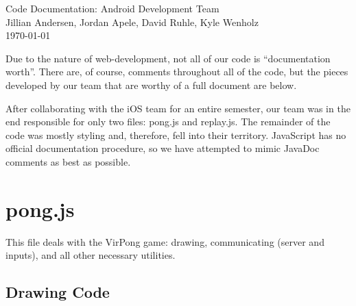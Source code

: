 \documentclass[12pt]{article}
\begin{document}
 \begin{titlepage}
    \vspace*{\fill}
    \begin{center}
      {\Huge Code Documentation: Android Development Team}\\[0.5cm]
      {\Large Jillian Andersen, Jordan Apele, David Ruhle, Kyle Wenholz}\\[0.4cm]
      \today
    \end{center}
    \vspace*{\fill}
  \end{titlepage}
  
\newpage


Due to the nature of web-development, not all of our code is ``documentation 
worth''.  There are, of course, comments throughout all of the code, but 
the pieces developed by our team that are worthy of a full document are below.

After collaborating with the iOS team for an entire semester, our team was 
in the end responsible for only two files: pong.js and replay.js.   The 
remainder of the code was mostly styling and, therefore, fell into their 
territory.  JavaScript has no official documentation procedure, so we 
have attempted to mimic JavaDoc comments as best as possible.
\singlespacing
\section{pong.js}
This file deals with the VirPong game: drawing, communicating (server and 
inputs), and all other necessary utilities.
\subsection{Drawing Code}
\end{document}
